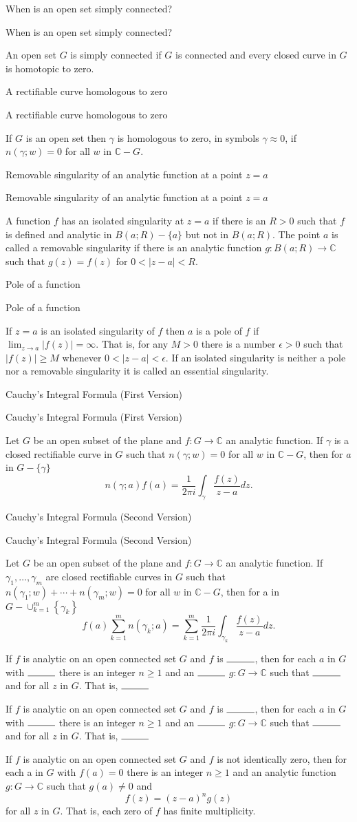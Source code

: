 \documentclass[17pt]{extarticle}
\renewcommand{\C}{\mathbb{C}}
\newcommand{\boxset}[2]{\begin{mdframed}[style=darkQuesion]
#1
\end{mdframed}
\newpage
\begin{mdframed}[style=darkQuesion]
  #1
    \end{mdframed}
\begin{mdframed}[style=darkAnswer]
  #2
    \end{mdframed}
    \newpage
}
\begin{document}
\boxset{When is an open set simply connected? }
{ An open set $G$ is simply connected if $G$ is connected and every closed curve in $G$ is homotopic to zero.}
\boxset{A rectifiable curve homologous to zero }
{ If $G$ is an open set then $\gamma$ is homologous to zero, in symbols $\gamma \approx 0$, if $n(\gamma ; w)=0$ for all $w$ in $\C-G$.}
\boxset{Removable singularity of an analytic function at a point $z=a$ }
{ A function $f$ has an isolated singularity at $z=a$ if there is an $R>0$ such that $f$ is defined and analytic in $B(a ; R)-\{a\}$ but not in $B(a ; R)$. The point $a$ is called a removable singularity if there is an analytic function $g: B(a ; R) \rightarrow \C$ such that $g(z)=f(z)$ for $0<|z-a|<R$.}
\boxset{Pole of a function }
{If $z=a$ is an isolated singularity of $f$ then $a$ is a pole of $f$ if $\lim _{z \rightarrow a}|f(z)|=\infty$. That is, for any $M>0$ there is a number $\epsilon>0$ such that $|f(z)| \geq M$ whenever $0<|z-a|<\epsilon$. If an isolated singularity is neither a pole nor a removable singularity it is called an essential singularity.}
\boxset{Cauchy's Integral Formula (First Version) }
{Let $G$ be an open subset of the plane and $f: G \rightarrow \mathbb{C}$ an analytic function. If $\gamma$ is a closed rectifiable curve in $G$ such that $n(\gamma ; w)=0$ for all $w$ in $\mathbb{C}-G$, then for $a$ in $G-\{\gamma\}$ \[n(\gamma ; a) f(a)=\frac{1}{2 \pi i} \int_{\gamma} \frac{f(z)}{z-a} d z .\]}
\boxset{Cauchy's Integral Formula (Second Version) }
{Let $G$ be an open subset of the plane and $f: G \rightarrow \mathbb{C}$ an analytic function. If $\gamma_{1}, \ldots, \gamma_{m}$ are closed rectifiable curves in $G$ such that $n\left(\gamma_{1} ; w\right)+\cdots+n\left(\gamma_{m} ; w\right)=0$ for all $w$ in $\mathbb{C}-G$, then for a in $G-\cup_{k=1}^{m}\left\{\gamma_{k}\right\}$ \[f(a) \sum_{k=1}^{m} n\left(\gamma_{k} ; a\right)=\sum_{k=1}^{m} \frac{1}{2 \pi i} \int_{\gamma_{k}} \frac{f(z)}{z-a} d z .\]}
\boxset{ If $f$ is analytic on an open connected set $G$ and $f$ is $\rule{1cm}{0.15mm}$, then for each $a$ in $G$ with $\rule{1cm}{0.15mm}$ there is an integer $n \geq 1$ and an $\rule{1cm}{0.15mm}$ $g: G \rightarrow \mathbb{C}$ such that $\rule{1cm}{0.15mm}$ and for all $z$ in $G$. That is, $\rule{1cm}{0.15mm}$  }
{ If $f$ is analytic on an open connected set $G$ and $f$ is not identically zero, then for each a in $G$ with $f(a)=0$ there is an integer $n \geq 1$ and an analytic function $g: G \rightarrow \mathbb{C}$ such that $g(a) \neq 0$ and \[f(z)=(z-a)^{n} g(z)\] for all $z$ in $G$. That is, each zero of $f$ has finite multiplicity.}
\end{document}

